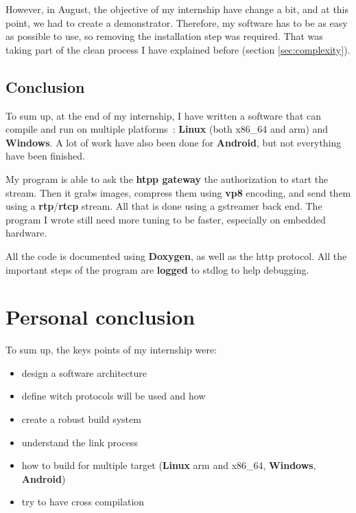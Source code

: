 \documentclass[a4paper,11pt]{custom}
\newcommand{\rtp}{\textbf{rtp}\xspace}
\newcommand{\rtcp}{\textbf{rtcp}\xspace}
\newcommand{\vpx}{\textbf{vp8}\xspace}
\newcommand{\linux}{\textbf{Linux}\xspace}
\newcommand{\win}{\textbf{Windows}\xspace}
\newcommand{\android}{\textbf{Android}\xspace}
\begin{document}
However, in August, the objective of my internship have change a bit, and at this
point, we had to create a demonstrator. Therefore, my software has to be as easy
as possible to use, so removing the installation step was required. That was
taking part of the clean process I have explained before (section
\ref{sec:complexity}).

\section{Conclusion}

To sum up, at the end of my internship, I have written a software that can compile
and run on multiple platforms~: \linux{} (both x86\_64 and arm) and \win. A lot
of work have also been done for \android, but not everything have been finished.

My program is able to ask the \textbf{htpp gateway} the authorization to start the stream.
Then it grabs images, compress them using \vpx{} encoding, and send them using a
\rtp{}/\rtcp{} stream. All that is done using a gstreamer back end. The program I
wrote still need more tuning to be faster, especially on embedded hardware.

All the code is documented using \textbf{Doxygen}, as well as the http protocol.
All the important steps of the program are \textbf{logged} to stdlog to help
debugging.

\chapter{Personal conclusion}

To sum up, the keys points of my internship were:
\begin{multicols}{2}
\begin{itemize}
\item design a software architecture
\item define witch protocols will be used and how
\item create a robust build system
\item understand the link process
\item how to build for multiple target (\linux{} arm and x86\_64, \win, \android)
\item try to have cross compilation
\end{itemize}
\end{multicols}
\end{document}
